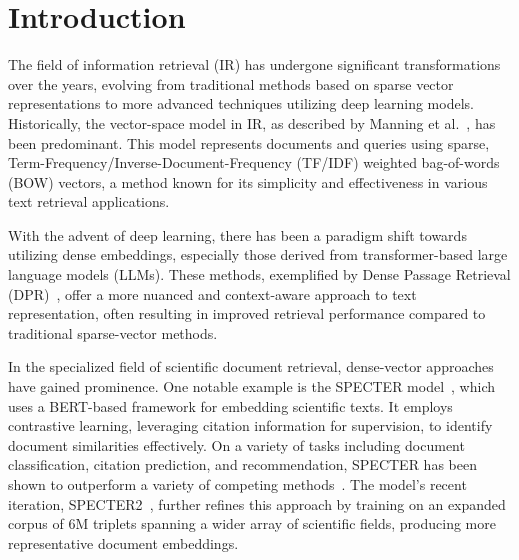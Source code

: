 \documentclass[
]{ceurart}
\begin{document}
\maketitle

\section{Introduction}

The field of information retrieval (IR) has undergone significant transformations over the years, evolving from traditional methods based on sparse vector representations to more advanced techniques utilizing deep learning models. Historically, the vector-space model in IR, as described by Manning et al.~\cite{manning:book08}, has been predominant. This model represents documents and queries using sparse, Term-Frequency/Inverse-Document-Frequency (TF/IDF) weighted bag-of-words (BOW) vectors, a method known for its simplicity and effectiveness in various text retrieval applications.

With the advent of deep learning, there has been a paradigm shift towards utilizing dense embeddings, especially those derived from transformer-based large language models (LLMs). These methods, exemplified by Dense Passage Retrieval (DPR)~\cite{dpr}, offer a more nuanced and context-aware approach to text representation, often resulting in improved retrieval performance compared to traditional sparse-vector methods.

In the specialized field of scientific document retrieval, dense-vector approaches have gained prominence. One notable example is the SPECTER model~\cite{specter}, which uses a BERT-based framework for embedding scientific texts. It employs contrastive learning, leveraging citation information for supervision, to identify document similarities effectively. 
On a variety of tasks including document classification, citation prediction, and recommendation, SPECTER has been shown to outperform a variety of competing methods~\cite{specter}.
The model's recent iteration, SPECTER2~\cite{singh2023scirepeval}, further refines this approach by training on an expanded corpus of 6M triplets spanning a wider array of scientific fields, producing more representative document embeddings.
\end{document}
